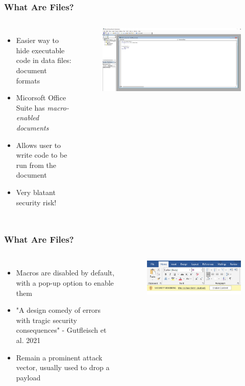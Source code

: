 \documentclass[fleqn]{beamer}
\begin{document}
\begin{frame}
  \frametitle{What Are Files?}
  \begin{columns}[T]
    \column{\textwidth}
    \begin{itemize}
      \item Easier way to hide executable code in data files: document formats
      \item Micorsoft Office Suite has \emph{macro-enabled documents}
      \item Allows user to write code to be run from the document
      \item Very blatant security risk!
    \end{itemize}
    \begin{figure}[H]
      \centering
      \includegraphics[scale=0.33]{images/ms_office_macro_editor.jpg}
    \end{figure}
  \end{columns}
\end{frame}

\begin{frame}
  \frametitle{What Are Files?}
  \begin{columns}[T]
    \column{\textwidth}
    \begin{itemize}
      \item Macros are disabled by default, with a pop-up option to enable them
      \item "A design comedy of errors with tragic security consequences" - Gutfleisch et al. 2021
      \item Remain a prominent attack vector, usually used to drop a payload
    \end{itemize}
    \begin{figure}[H]
      \centering
      \includegraphics[scale=0.5]{images/macro_security_popup.png}
    \end{figure}
  \end{columns}
\end{frame}
\end{document}
